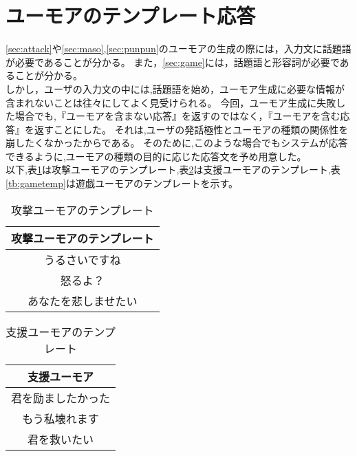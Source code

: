 \section{ユーモアのテンプレート応答}\label{sec:humor_template}
\ref{sec:attack}や\ref{sec:maso},\ref{sec:punpun}のユーモアの生成の際には，入力文に話題語が必要であることが分かる。
また，\ref{sec:game}には，話題語と形容詞が必要であることが分かる。\\
\hspace{1zw}しかし，ユーザの入力文の中には,話題語を始め，ユーモア生成に必要な情報が含まれないことは往々にしてよく見受けられる。
今回，ユーモア生成に失敗した場合でも,『ユーモアを含まない応答』を返すのではなく，『ユーモアを含む応答』を返すことにした。
それは,ユーザの発話極性とユーモアの種類の関係性を崩したくなかったからである。
そのために,このような場合でもシステムが応答できるように,ユーモアの種類の目的に応じた応答文を予め用意した。\\
\hspace{1zw}以下,表\ref{tb:atatemp}は攻撃ユーモアのテンプレート,表\ref{tb:masotemp}は支援ユーモアのテンプレート,表\ref{tb:gametemp}は遊戯ユーモアのテンプレートを示す。

\begin{table}
\begin{center}
\caption{攻撃ユーモアのテンプレート}
\label{tb:atatemp}
\begin{tabular}{|c|}
\hline
攻撃ユーモアのテンプレート \\
\hline\hline
うるさいですね \\
\hline
怒るよ？ \\
\hline
あなたを悲しませたい \\
\hline
\end{tabular}
\end{center}
\end{table}


\begin{table}
\begin{center}
\caption{支援ユーモアのテンプレート}
\label{tb:masotemp}
\begin{tabular}{|c|}
\hline
支援ユーモア \\
\hline\hline
君を励ましたかった \\
\hline
もう私壊れます \\
\hline
君を救いたい \\
\hline
\end{tabular}
\end{center}
\end{table}


